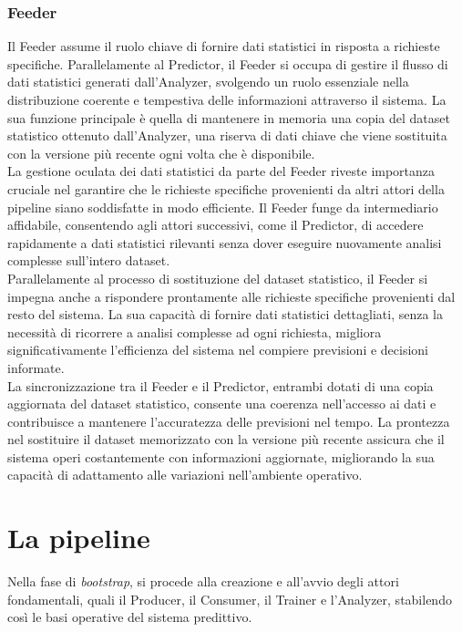\subsubsection[Feeder]{Feeder}
Il Feeder assume il ruolo chiave di fornire dati statistici in risposta a richieste specifiche.
Parallelamente al Predictor, il Feeder si occupa di gestire il flusso di dati statistici generati dall'Analyzer, svolgendo un ruolo essenziale nella distribuzione coerente e tempestiva delle informazioni attraverso il sistema.
La sua funzione principale è quella di mantenere in memoria una copia del dataset statistico ottenuto dall'Analyzer, una riserva di dati chiave che viene sostituita con la versione più recente ogni volta che è disponibile. \\
La gestione oculata dei dati statistici da parte del Feeder riveste importanza cruciale nel garantire che le richieste specifiche provenienti da altri attori della pipeline siano soddisfatte in modo efficiente.
Il Feeder funge da intermediario affidabile, consentendo agli attori successivi, come il Predictor, di accedere rapidamente a dati statistici rilevanti senza dover eseguire nuovamente analisi complesse sull'intero dataset. \\
Parallelamente al processo di sostituzione del dataset statistico, il Feeder si impegna anche a rispondere prontamente alle richieste specifiche provenienti dal resto del sistema.
La sua capacità di fornire dati statistici dettagliati, senza la necessità di ricorrere a analisi complesse ad ogni richiesta, migliora significativamente l'efficienza del sistema nel compiere previsioni e decisioni informate. \\
La sincronizzazione tra il Feeder e il Predictor, entrambi dotati di una copia aggiornata del dataset statistico, consente una coerenza nell'accesso ai dati e contribuisce a mantenere l'accuratezza delle previsioni nel tempo.
La prontezza nel sostituire il dataset memorizzato con la versione più recente assicura che il sistema operi costantemente con informazioni aggiornate, migliorando la sua capacità di adattamento alle variazioni nell'ambiente operativo.

\section[Pipeline]{La pipeline}
Nella fase di \textit{bootstrap}, si procede alla creazione e all'avvio degli attori fondamentali, quali il Producer, il Consumer, il Trainer e l'Analyzer, stabilendo così le basi operative del sistema predittivo.

